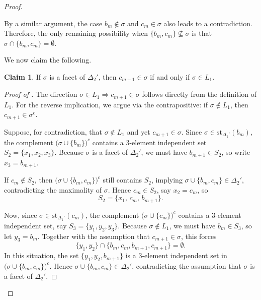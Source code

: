 \documentclass[11pt,reqno,a4paper]{amsart}
\theoremstyle{definition}
\theoremstyle{theorem}
\newtheorem{claim}{Claim}[theorem]
\newcommand{\lno}{\left(}
\newcommand{\rno}{\right)}
\newcommand{\st}{\mathrm{st}}
\theoremstyle{remark}
\begin{document}
\begin{proof}
\begin{enumerate}
\begin{enumerate}[label=\textbf{\Alph*.}, leftmargin=2.5em]
        By a similar argument, the case 
        $b_m \notin \sigma$ and $c_m \in \sigma$ 
        also leads to a contradiction. 
        Therefore, the only remaining possibility when 
        $\{b_m, c_m\} \not\subseteq \sigma$ 
        is that 
        \(
            \sigma \cap \{b_m, c_m\} = \emptyset.
        \)

    We now claim the following.

    \begin{claim}\label{claim: c_(m+1) in sigma iff sigma in L1}
        If $\sigma$ is a facet of $\Delta_2'$, then 
        $c_{m+1} \in \sigma$ if and only if $\sigma \in L_1$.
    \end{claim}

    \begin{proof}[Proof of ]\renewcommand{\qedsymbol}{}
        The direction $\sigma \in L_1 \Rightarrow c_{m+1} \in \sigma$ follows directly from the definition of $L_1$. 
        For the reverse implication, we argue via the contrapositive:  
        if $\sigma \notin L_1$, then $c_{m+1} \in \sigma^c$.

        Suppose, for contradiction, that $\sigma \notin L_1$ and yet $c_{m+1} \in \sigma$. 
        Since $\sigma \in \st_{\Delta_1'}\lno b_m \rno$, the complement 
        $\bigl( \sigma \cup \{b_m\} \bigr)^c$ 
        contains a $3$-element independent set 
        \( S_2 = \{x_1, x_2, x_3\} \).  
        Because $\sigma$ is a facet of $\Delta_2'$, we must have 
        \( b_{m+1} \in S_2 \), so write \( x_3 = b_{m+1} \).

        If $c_m \notin S_2$, then 
        \(
            \bigl( \sigma \cup \{b_m, c_m\} \bigr)^c
        \)
        still contains $S_2$, implying 
        \( \sigma \cup \{b_m, c_m\} \in \Delta_2' \), 
        contradicting the maximality of $\sigma$.  
        Hence $c_m \in S_2$, say \( x_2 = c_m \), so
        \[
            S_2 = \{x_1,\, c_m,\, b_{m+1}\}.
        \]

    Now, since $\sigma \in \st_{\Delta_1'}\lno c_m \rno$, the complement 
    $\bigl( \sigma \cup \{c_m\} \bigr)^c$ contains a $3$-element independent set, say 
    \( S_3 = \{y_1, y_2, y_3\} \).  
    Because $\sigma \notin L_1$, we must have $b_m \in S_3$, so let $y_3 = b_m$.  
    Together with the assumption that $c_{m+1} \in \sigma$, this forces
    \[
        \{y_1, y_2\} \cap \{b_m, c_m, b_{m+1}, c_{m+1}\} = \emptyset.
    \]
    In this situation, the set 
    \( \{y_1, y_2, b_{m+1}\} \) 
    is a $3$-element independent set in 
    \( \bigl( \sigma \cup \{b_m, c_m\} \bigr)^c \).  
    Hence 
    \( \sigma \cup \{b_m, c_m\} \in \Delta_2' \), 
    contradicting the assumption that $\sigma$ is a facet of $\Delta_2'$.


\end{proof}
\end{enumerate}
\end{enumerate}
\end{proof}
\end{document}
